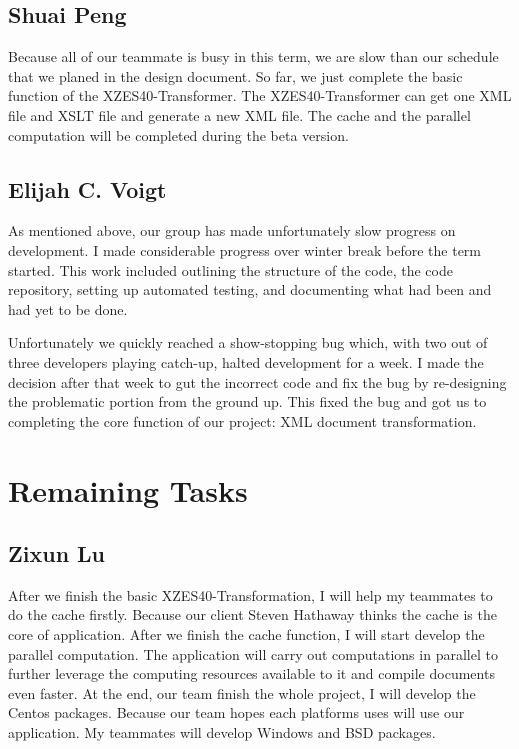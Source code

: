 \subsection{Shuai Peng}

Because all of our teammate is busy in this term, we are slow than our schedule that we planed in the design document. 
So far, we just complete the basic function of the XZES40-Transformer.
The XZES40-Transformer can get one XML file and XSLT file and generate a new XML file.
The cache and the parallel computation will be completed during the beta version.  

\subsection{Elijah C. Voigt}

As mentioned above, our group has made unfortunately slow progress on development.
I made considerable progress over winter break before the term started.
This work included outlining the structure of the code, the code repository, setting up automated testing, and documenting what had been and had yet to be done.

Unfortunately we quickly reached a show-stopping bug which, with two out of three developers playing catch-up, halted development for a week.
I made the decision after that week to gut the incorrect code and fix the bug by re-designing the problematic portion from the ground up.
This fixed the bug and got us to completing the core function of our project: XML document transformation.

\section{Remaining Tasks}

\subsection{Zixun Lu}

After we finish the basic XZES40-Transformation, I will help my teammates to do the cache firstly. 
Because our client Steven Hathaway thinks the cache is the core of application. 
After we finish the cache function, I will start develop the parallel computation. 
The application will carry out computations in parallel to further leverage the computing resources available to it and compile documents even faster. 
At the end, our team finish the whole project, I will develop the Centos packages.
Because our team hopes each platforms uses will use our application.
My teammates will develop Windows and BSD packages.


